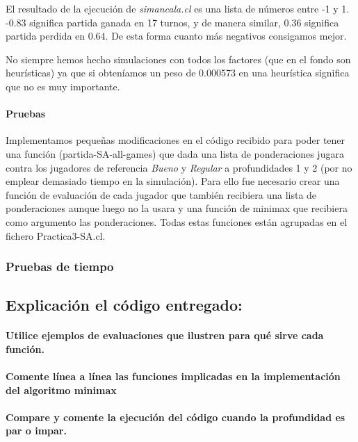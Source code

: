 \documentclass[nochap]{apuntes}
\begin{document}
El resultado de la ejecución de \textit{simancala.cl} es una lista de números entre -1 y 1. -0.83 significa partida ganada en 17 turnos, y de manera similar, 0.36 significa partida perdida en 0.64. De esta forma cuanto más negativos consigamos mejor. 

No siempre hemos hecho simulaciones con todos los factores (que en el fondo son heurísticas) ya que si obteníamos un peso de 0.000573 en una heurística significa que no es muy importante. 

\paragraph{Pruebas}

Implementamos pequeñas modificaciones en el código recibido para poder tener una función (partida-SA-all-games) que dada una lista de ponderaciones jugara contra los jugadores de referencia \textit{Bueno} y \textit{Regular} a profundidades 1 y 2 (por no emplear demasiado tiempo en la simulación). Para ello fue necesario crear una función de evaluación de cada jugador que también recibiera una lista de ponderaciones aunque luego no la usara y una función de minimax que recibiera como argumento las ponderaciones. Todas estas funciones están agrupadas en el fichero Practica3-SA.cl. 


\subsubsection*{Pruebas de tiempo}

\subsection*{Explicación el código entregado:}
\paragraph{Utilice ejemplos de evaluaciones que ilustren para qué sirve cada función.}
\paragraph{Comente línea a línea las funciones implicadas en la implementación del algoritmo minimax}

\paragraph{Compare y comente la ejecución del código cuando la profundidad es par o impar.}
\end{document}
